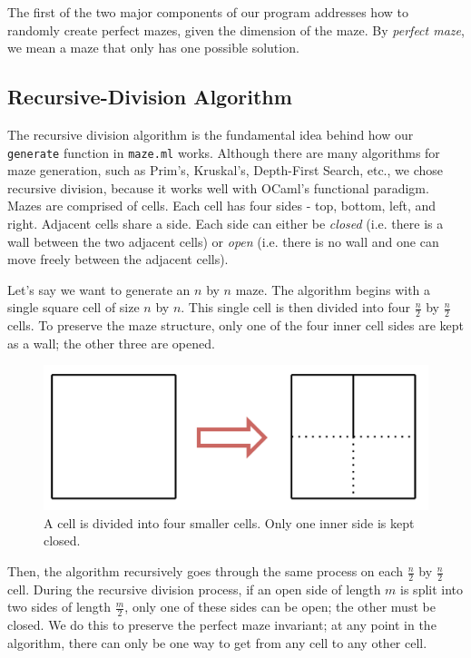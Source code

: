 \documentclass[11pt, margin=1in]{article}
\newcommand{\tab}{\par \qquad}
\begin{document}
The first of the two major components of our program addresses how to randomly create perfect mazes, given the dimension of the maze. By \emph{perfect maze}, we mean a maze that only has one possible solution.    

\subsection{Recursive-Division Algorithm}  %
The recursive division algorithm is the fundamental idea behind how our \texttt{generate} function in \texttt{maze.ml} works.  Although there are many algorithms for maze generation, such as Prim's, Kruskal's, Depth-First Search, etc., we chose recursive division, because it works well with OCaml's functional paradigm.  Mazes are comprised of cells.  Each cell has four sides - top, bottom, left, and right.  Adjacent cells share a side.  Each side can either be \emph{closed} (i.e. there is a wall between the two adjacent cells) or \emph{open} (i.e. there is no wall and one can move freely between the adjacent cells).  
\tab Let's say we want to generate an $n$ by $n$ maze.  The algorithm begins with a single square cell of size $n$ by $n$.   This single cell is then divided into four $\frac{n}{2}$ by $\frac{n}{2}$ cells.  To preserve the maze structure, only one of the four inner cell sides are kept as a wall; the other three are opened.  

\begin{figure}[H]
\begin{center}
\includegraphics[scale=0.7]{gen1.jpg}
\end{center}
\caption{A cell is divided into four smaller cells.  Only one inner side is kept closed.}
\end{figure}     


Then, the algorithm recursively goes through the same process on each $\frac{n}{2}$ by $\frac{n}{2}$ cell.  During the recursive division process, if an open side of length $m$ is split into two sides of length $\frac{m}{2}$, only one of these sides can be open; the other must be closed.  We do this to preserve the perfect maze invariant; at any point in the algorithm, there can only be one way to get from any cell to any other cell.              
\end{document}
